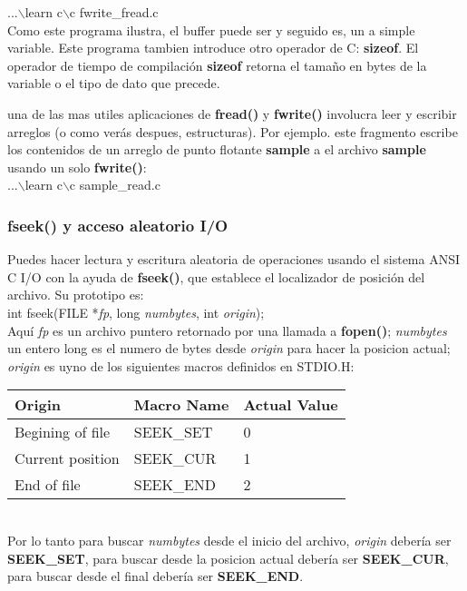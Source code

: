 \documentclass[]{article}
\begin{document}
	...$\backslash$learn c$\backslash$c fwrite\_fread.c\\
	 
	Como este programa ilustra, el buffer puede ser y seguido es, un a simple variable. Este programa tambien  introduce otro operador de C: \textbf{sizeof}. El operador de tiempo de compilación \textbf{sizeof} retorna el tamaño en bytes de la variable o el tipo de dato que precede.
	 
	una de las mas utiles aplicaciones de \textbf{fread()} y \textbf{fwrite()} involucra leer y escribir arreglos (o como verás despues, estructuras). Por ejemplo. este fragmento escribe los contenidos de un arreglo de punto flotante \textbf{sample} a el archivo \textbf{sample} usando un solo \textbf{fwrite()}:\\
	 
	...$\backslash$learn c$\backslash$c sample\_read.c
	 
	\subsubsection{fseek() y acceso aleatorio I/O}
	 
	Puedes hacer lectura y escritura aleatoria de operaciones usando el sistema ANSI C I/O con la ayuda de \textbf{fseek()}, que establece el localizador de posición del archivo. Su prototipo es:\\
	 
	int fseek(FILE *\textit{fp}, long \textit{numbytes}, int \textit{origin});\\
	 
	Aquí \textit{fp} es un archivo puntero retornado por una llamada a \textbf{fopen()}; \textit{numbytes} un entero long es el numero de bytes desde \textit{origin} para hacer la posicion actual; \textit{origin} es uyno de los siguientes macros definidos en STDIO.H:\\
	 
	\begin{tabular}{l|l|l}
		\textbf{Origin} & \textbf{Macro Name} & \textbf{Actual Value}\\
		\hline
		Begining of file & SEEK\_SET & 0\\[.7ex]
		Current position & SEEK\_CUR & 1\\[.7ex]
		End of file & SEEK\_END & 2
	\end{tabular}\\

	Por lo tanto para buscar \textit{numbytes} desde el inicio del archivo, \textit{origin} debería ser \textbf{SEEK\_SET}, para buscar desde la posicion actual debería ser \textbf{SEEK\_CUR}, para buscar desde el final debería ser \textbf{SEEK\_END}.\\
	
\end{document}
